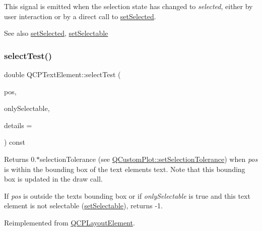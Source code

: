 This signal is emitted when the selection state has changed to {\itshape selected}, either by user interaction or by a direct call to \hyperlink{class_q_c_p_text_element_aba5521f9fb22a5f3d2f09ab37d4a1751}{set\+Selected}.

\begin{DoxySeeAlso}{See also}
\hyperlink{class_q_c_p_text_element_aba5521f9fb22a5f3d2f09ab37d4a1751}{set\+Selected}, \hyperlink{class_q_c_p_text_element_a3c5f9b1897a036b16495ed3fb8371c55}{set\+Selectable} 
\end{DoxySeeAlso}
\mbox{\label{class_q_c_p_text_element_a1e721bc2994a127ef5a8f0a514a5dbac}} 
\subsubsection{\texorpdfstring{select\+Test()}{selectTest()}}
{\footnotesize\ttfamily double Q\+C\+P\+Text\+Element\+::select\+Test (\begin{DoxyParamCaption}\item[{const Q\+PointF \&}]{pos,  }\item[{bool}]{only\+Selectable,  }\item[{Q\+Variant $\ast$}]{details = {} }\end{DoxyParamCaption}) const\hspace{0.3cm}{\ttfamily [virtual]}}

Returns 0.$\ast$selection\+Tolerance (see \hyperlink{class_q_custom_plot_a4dc31241d7b09680950e19e5f971ed93}{Q\+Custom\+Plot\+::set\+Selection\+Tolerance}) when {\itshape pos} is within the bounding box of the text element\textquotesingle{}s text. Note that this bounding box is updated in the draw call.

If {\itshape pos} is outside the text\textquotesingle{}s bounding box or if {\itshape only\+Selectable} is true and this text element is not selectable (\hyperlink{class_q_c_p_text_element_a3c5f9b1897a036b16495ed3fb8371c55}{set\+Selectable}), returns -\/1.

Reimplemented from \hyperlink{class_q_c_p_layout_element_ae97f483cccedadbf18ea4525ef240ee4}{Q\+C\+P\+Layout\+Element}.

\mbox{\label{class_q_c_p_text_element_a09b3241769528fa87cb4bf35c97defad}} 
